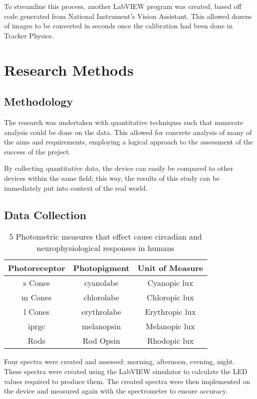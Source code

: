 To streamline this process, another LabVIEW program was created, based off code generated from National Instrument's Vision Assistant. This allowed dozens of images to be converted in seconds once the calibration had been done in Tracker Physics. 

\section{Research Methods}

\subsection{Methodology}

The research was undertaken with quantitative techniques such that numerate analysis could be done on the data. This allowed for concrete analysis of many of the aims and requirements, employing a logical approach to the assessment of the success of the project.

By collecting quantitative data, the device can easily be compared to other devices within the same field; this way, the results of this study can be immediately put into context of the real world.

\subsection{Data Collection}

\begin{table*}[tb]
\centering
\begin{tabular}{c|c|c}
Photoreceptor     & Photopigment & Unit of Measure   \\\hline\hline
\acrfull{s} Cones & cyanolabe   & Cyanopic lux      \\\hline
\acrfull{m} Cones & chlorolabe  & Chloropic lux  	\\\hline
\acrfull{l} Cones & erythrolabe & Erythropic lux	\\\hline
\acrfull{iprgc}   & melanopsin  & Melanopic lux  	\\\hline
Rods              & Rod Opsin   & Rhodopic lux    
\end{tabular}
\caption{5 Photometric measures that effect cause circadian and neurophysiological responses in humans \citep{lucasMeasuringUsingLight2014}}
\label{Tab:photometrics}
\end{table*}



Four spectra were created and assessed: \acrfull{morning}, \acrfull{afternoon}, \acrfull{evening}, \acrfull{night}. These spectra were created using the LabVIEW simulator to calculate the LED values required to produce them. The created spectra were then implemented on the device and measured again with the spectrometer to ensure accuracy.

